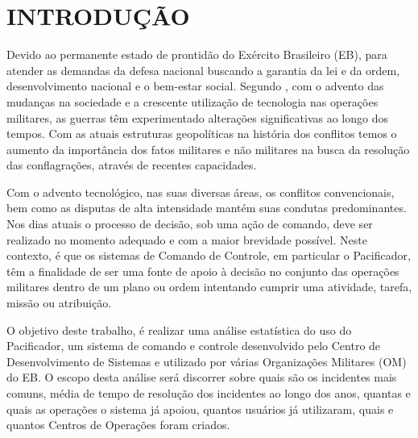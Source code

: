 % 
%


\chapter{INTRODUÇÃO}
Devido ao permanente estado de prontidão do Exército Brasileiro (EB), para atender as demandas da defesa nacional buscando a garantia da lei e da ordem, desenvolvimento nacional e o bem-estar social. Segundo \cite{operacao2017}, com o advento das mudanças na sociedade e a crescente utilização de  tecnologia nas operações militares, as guerras têm experimentado alterações significativas ao longo dos tempos. Com as atuais estruturas geopolíticas na história dos conflitos temos o aumento da importância dos fatos militares e não militares na busca da resolução das conflagrações, através de recentes capacidades.

Com o advento tecnológico, nas suas diversas áreas, os conflitos convencionais, bem como as disputas de alta intensidade mantém suas condutas predominantes. Nos dias atuais o processo de decisão, sob uma ação de comando, deve ser realizado no momento adequado e com a maior brevidade possível. Neste contexto, é que os sistemas de Comando de Controle, em particular o Pacificador, têm a finalidade de ser uma fonte de apoio à decisão no conjunto das operações militares dentro de um plano ou ordem intentando cumprir uma atividade, tarefa, missão ou atribuição. 

O objetivo deste trabalho, é realizar uma análise estatística do uso do Pacificador, um sistema de comando e controle desenvolvido pelo Centro de Desenvolvimento de Sistemas e utilizado por várias Organizações Militares (OM) do EB. O escopo desta análise será discorrer sobre quais são os incidentes mais comuns, média de tempo de resolução dos incidentes ao longo dos anos, quantas e quais as operações o sistema já apoiou, quantos usuários já utilizaram, quais e quantos Centros de Operações foram criados.

